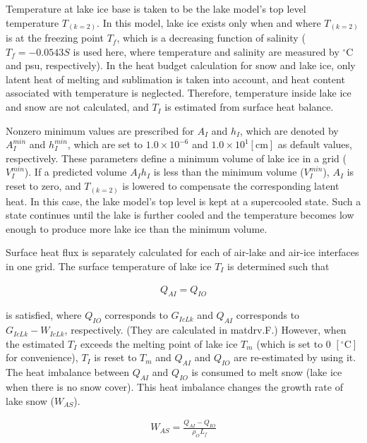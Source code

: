 Temperature at lake ice base is taken to be the lake model's top level temperature \(T_{(k=2)}\). In this model, lake ice exists only when and where \(T_{(k=2)}\) is at the freezing point \(T_f\),
which is a decreasing function of salinity (\(T_f=-0.0543 S\) is used here, where temperature and salinity are measured by \(\mathrm{^\circ C}\) and psu, respectively). In the heat budget calculation
for snow and lake ice, only latent heat of melting and sublimation is taken into account, and heat content associated with temperature is neglected. Therefore, temperature inside lake ice and snow are
not calculated, and \(T_I\) is estimated from surface heat balance.

Nonzero minimum values are prescribed for \(A_I\) and \(h_I\), which are denoted by \(A_I^{min}\) and \(h_I^{min}\), which are set to \(1.0\times 10^{-6}\) and \(1.0\times 10^1 \mathrm{[cm]}\) as
default values, respectively. These parameters define a minimum volume of lake ice in a grid (\(V_I^{min}\)). If a predicted volume \(A_Ih_I\) is less than the minimum volume (\(V_I^{min}\)), \(A_I\)
is reset to zero, and \(T_{(k=2)}\) is lowered to compensate the corresponding latent heat. In this case, the lake model's top level is kept at a supercooled state. Such a state continues until the
lake is further cooled and the temperature becomes low enough to produce more lake ice than the minimum volume.

Surface heat flux is separately calculated for each of air-lake and air-ice interfaces in one grid. The surface temperature of lake ice \(T_I\) is determined such that

\begin{eqnarray}
    Q_{AI} = Q_{IO}
\end{eqnarray}

is satisfied, where \(Q_{IO}\) corresponds to \(G_{IcLk}\) and \(Q_{AI}\) corresponds to \(G_{IcLk} - W_{IcLk}\), respectively. (They are calculated in matdrv.F.) However, when the estimated \(T_I\)
exceeds the melting point of lake ice \(T_m\) (which is set to 0 \(\mathrm{[^\circ C]}\) for convenience), \(T_I\) is reset to \(T_m\) and \(Q_{AI}\) and \(Q_{IO}\) are re-estimated by using it. The
heat imbalance between \(Q_{AI}\) and \(Q_{IO}\) is consumed to melt snow (lake ice when there is no snow cover). This heat imbalance changes the growth rate of lake snow (\(W_{AS}\)).

\begin{eqnarray}
    W_{AS} = \frac{Q_{AI}-Q_{IO}}{\rho_O L_f}
\end{eqnarray}

